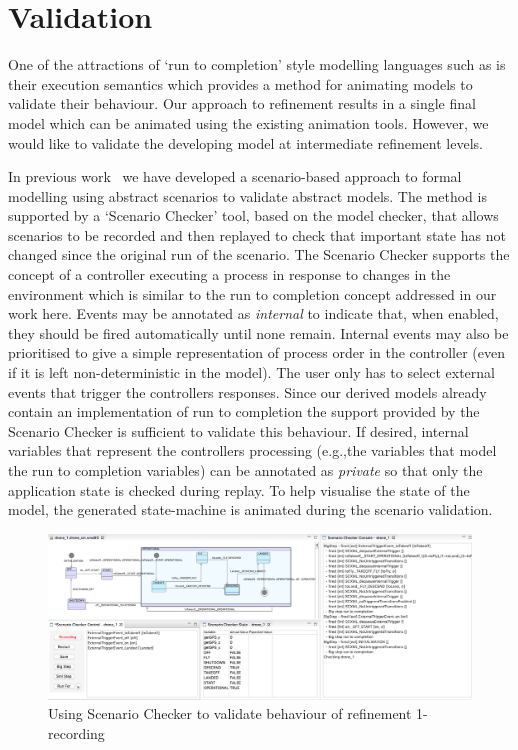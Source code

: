 

\section{Validation}
\label{sec:validation}

One of the attractions of `run to completion' style modelling languages such as \SCXML is their execution semantics which provides a method for animating models to validate their behaviour.
Our approach to \SCXML refinement results in a single \SCXML final model which can be animated using the existing \SCXML animation tools.
However, we would like to validate the developing \UMLB model at intermediate refinement levels. 

In previous work~\cite{snook20JSA} we have developed a scenario-based approach to formal modelling using abstract scenarios to validate abstract models.
The method is supported by a `Scenario Checker' tool, based on the \PROB model checker, that allows scenarios to be recorded and then replayed to check that important state has not changed since the original run of the scenario.
The Scenario Checker supports the concept of a controller executing a process in response to changes in the environment which is similar to the run to completion concept addressed in our work here.
Events may be annotated as \emph{internal} to indicate that, when enabled, they should be fired automatically until none remain.
Internal events may also be prioritised to give a simple representation of process order in the controller (even if it is left non-deterministic in the model).
The user only has to select external events that trigger the controllers responses.
Since our \SCXML derived models already contain an implementation of run to completion the support provided by the Scenario Checker is sufficient to validate this behaviour.
If desired, internal variables that represent the controllers processing (e.g.,the variables that model the \SCXML run to completion variables) can be annotated as \emph{private} so that only the application state is checked during replay.
To help visualise the state of the model, the generated \UMLB state-machine is animated during the scenario validation.

\begin{figure}[!th]
	\centering
	\includegraphics[width=1\textwidth, trim=30 50 60 0]{figures/scenarioChecker_recording_drone1.png}
	\caption{Using Scenario Checker to validate behaviour of refinement 1- recording}
	\label{fig:scenarioCheckerRecordingDrone1}
\end{figure}

